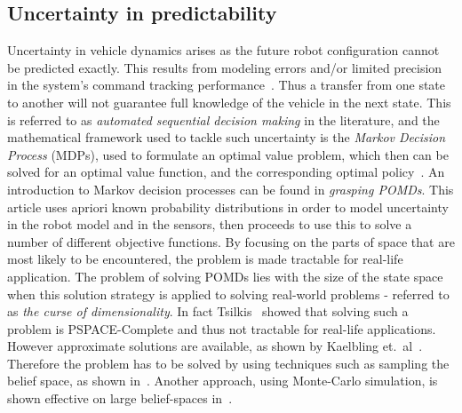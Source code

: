 \subsection{Uncertainty in predictability}
Uncertainty in vehicle dynamics arises as the future robot configuration cannot
be predicted exactly. This results from modeling errors and/or limited precision
in the system's command tracking
performance~\cite{dadkhahSurveyMotionPlanning2012}. Thus a transfer from one
state to another will not guarantee full knowledge of the vehicle in the next
state. This is referred to as \textit{automated sequential decision making} in
the literature, and the mathematical framework used to tackle such uncertainty
is the \textit{Markov Decision Process} (MDPs), used to formulate an optimal
value problem, which then can be solved for an optimal value function, and the
corresponding optimal policy~\cite{Cassandra:1998:EAA:926710}. An introduction
to Markov decision processes can be found in \textit{grasping
  POMDs}\cite{kaelblingPlanningActingPartially1998}. This article uses apriori
known probability distributions in order to model uncertainty in the robot model
and in the sensors, then proceeds to use this to solve a number of different
objective functions. By focusing on the parts of space that are most likely to
be encountered, the problem is made tractable for real-life application. The
problem of solving POMDs lies with the size of the state space when this
solution strategy is applied to solving real-world problems - referred to as
\textit{the curse of dimensionality}. In fact
Tsilkis~\cite{christosh.papadimitriouComplexityMarkovDecision1987} showed that
solving such a problem is PSPACE-Complete and thus not tractable for real-life
applications. However approximate solutions are available, as shown by Kaelbling
et.\ al~\cite{kaelblingPlanningActingPartially1998}. Therefore the problem has
to be solved by using techniques such as sampling the belief space, as shown
in~\cite{kearnsSparseSamplingAlgorithm}. Another approach, using Monte-Carlo
simulation, is shown effective on large belief-spaces
in~\cite{silverMonteCarloPlanningLarge}.


